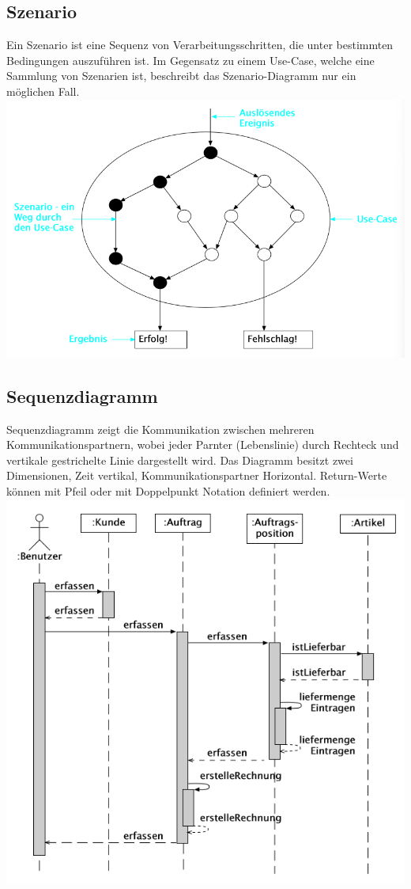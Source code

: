 \subsection{Szenario}
Ein Szenario ist eine Sequenz von Verarbeitungsschritten, die unter bestimmten Bedingungen auszuführen ist. Im Gegensatz zu einem Use-Case, welche eine Sammlung von Szenarien ist, beschreibt das Szenario-Diagramm nur ein möglichen Fall.
\includegraphics[width=\columnwidth]{Images/szenario}


\subsection{Sequenzdiagramm}
Sequenzdiagramm zeigt die Kommunikation zwischen mehreren Kommunikationspartnern, wobei jeder Parnter (Lebenslinie) durch Rechteck und vertikale gestrichelte Linie dargestellt wird. Das Diagramm besitzt zwei Dimensionen, Zeit vertikal, Kommunikationspartner Horizontal. Return-Werte können mit Pfeil oder mit Doppelpunkt Notation definiert werden.
\includegraphics[width=\columnwidth]{Images/sequenzdiagramm}

